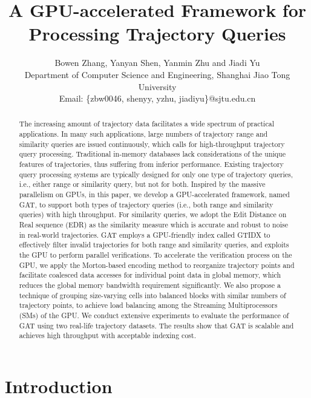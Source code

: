 \documentclass[10pt,conference,letterpaper]{IEEEtran}
\title{A GPU-accelerated Framework for Processing Trajectory Queries}
\author{%
{Bowen Zhang, Yanyan Shen, Yanmin Zhu and Jiadi Yu }\\
Department of Computer Science and Engineering, Shanghai Jiao Tong University\\
Email: \{zbw0046, shenyy, yzhu, jiadiyu\}@sjtu.edu.cn
}
\begin{document}
\maketitle
%
\begin{abstract}
The increasing amount of trajectory data facilitates a wide spectrum of practical applications. In many such applications, large numbers of trajectory range and similarity queries are issued continuously, which calls for high-throughput trajectory query processing. Traditional in-memory databases lack considerations of the unique features of trajectories, thus suffering from inferior performance. Existing trajectory query processing systems are typically designed for only one type of trajectory queries, i.e., either range or similarity query,  but not for both.
Inspired by the massive parallelism on GPUs, in this paper, we develop a GPU-accelerated framework, named GAT, to support both types of trajectory queries (i.e., both range and similarity queries) with high throughput.
For similarity queries, we adopt the Edit Distance on Real sequence (EDR) as the similarity measure which is accurate and robust to noise in real-world trajectories.
GAT employs a GPU-friendly index called GTIDX to effectively filter invalid trajectories for both range and similarity queries, and exploits the GPU to perform parallel verifications.
To accelerate the verification process on the GPU, we apply the Morton-based encoding method to reorganize trajectory points and facilitate coalesced data accesses for individual point data in global memory, which reduces the global memory bandwidth requirement significantly. We also propose a technique of grouping size-varying cells into balanced blocks with similar numbers of trajectory points, to achieve load balancing among the Streaming Multiprocessors (SMs) of the GPU.
We conduct extensive experiments to evaluate the performance of GAT using two real-life trajectory datasets. The results show that GAT is scalable and achieves high throughput with acceptable indexing cost.
\end{abstract}

%


\section{Introduction}\label{sec:intro}
\end{document}
